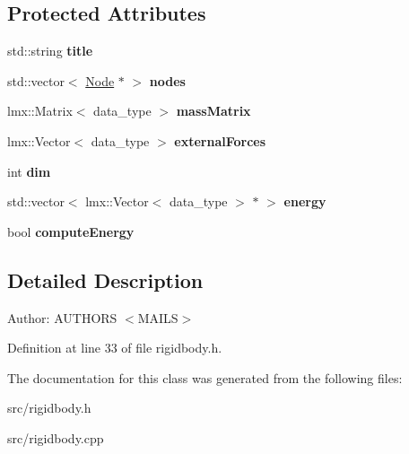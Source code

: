 \subsection*{Protected Attributes}
\begin{CompactItemize}
\item 
\hypertarget{classmknix_1_1RigidBody_915b7c7f709906c52c2cffb9a6438455}{
std::string \textbf{title}}
\label{classmknix_1_1RigidBody_915b7c7f709906c52c2cffb9a6438455}

\item 
\hypertarget{classmknix_1_1RigidBody_fed973b309e9da05d531c714e535fc41}{
std::vector$<$ \hyperlink{classmknix_1_1Node}{Node} $\ast$ $>$ \textbf{nodes}}
\label{classmknix_1_1RigidBody_fed973b309e9da05d531c714e535fc41}

\item 
\hypertarget{classmknix_1_1RigidBody_a0240b71af06604cbb213cc977e6969a}{
lmx::Matrix$<$ data\_\-type $>$ \textbf{massMatrix}}
\label{classmknix_1_1RigidBody_a0240b71af06604cbb213cc977e6969a}

\item 
\hypertarget{classmknix_1_1RigidBody_b465103ed21d529c66733705ad5b588c}{
lmx::Vector$<$ data\_\-type $>$ \textbf{externalForces}}
\label{classmknix_1_1RigidBody_b465103ed21d529c66733705ad5b588c}

\item 
\hypertarget{classmknix_1_1RigidBody_bdb2cd12b0d4c08b6ba7a7c3fd84b2e2}{
int \textbf{dim}}
\label{classmknix_1_1RigidBody_bdb2cd12b0d4c08b6ba7a7c3fd84b2e2}

\item 
\hypertarget{classmknix_1_1RigidBody_372052707d7e00a97db50ce6d323cdf3}{
std::vector$<$ lmx::Vector$<$ data\_\-type $>$ $\ast$ $>$ \textbf{energy}}
\label{classmknix_1_1RigidBody_372052707d7e00a97db50ce6d323cdf3}

\item 
\hypertarget{classmknix_1_1RigidBody_569b96d28e2b0c008240a001c3a87eb3}{
bool \textbf{computeEnergy}}
\label{classmknix_1_1RigidBody_569b96d28e2b0c008240a001c3a87eb3}

\end{CompactItemize}


\subsection{Detailed Description}
\begin{Desc}
\item[Author:]AUTHORS $<$MAILS$>$ \end{Desc}


Definition at line 33 of file rigidbody.h.

The documentation for this class was generated from the following files:\begin{CompactItemize}
\item 
src/rigidbody.h\item 
src/rigidbody.cpp\end{CompactItemize}
